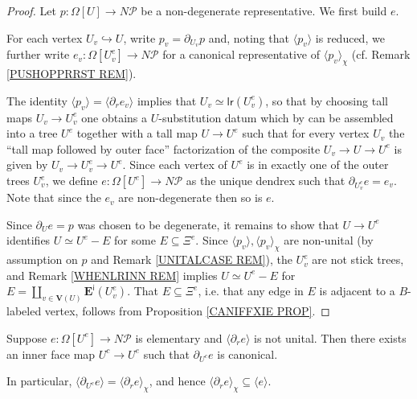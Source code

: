 \documentclass[a4paper,10pt
,draft
]{article}%
\renewcommand{\1}{\eta}%
\begin{document}
\begin{proof}
Let $p\colon \Omega[U] \to N \mathcal{P}$
be a non-degenerate representative. We first build $e$.


For each vertex $U_v \hookrightarrow U$, write
$p_v = \partial_{U_v} p$
and,
noting that $\langle p_v \rangle$ is reduced,
we further write 
$e_v \colon \Omega[U^e_v] \to N \mathcal{P}$
for a canonical representative of 
$\langle p_v \rangle_{\chi}$
(cf. Remark \ref{PUSHOPPRRST REM}).


The identity
$\langle p_v \rangle = \langle \partial_r e_v \rangle$
implies that
$U_v \simeq \mathsf{lr}(U^e_v)$,
so that by choosing tall maps $U_v \to U^e_v$ 
one obtains a $U$-substitution datum
\cite[Def. 3.38]{BP_geo}
which by 
\cite[Prop. 3.41]{BP_geo}
can be assembled into a tree $U^e$
together with a tall map
$U \to U^e$ such that for every vertex $U_v$
the ``tall map followed by outer face'' factorization of
the composite
$U_v \to U \to U^e$
is given by
$U_v \to U^e_v \to U^e$.
Since each vertex of $U^e$ is in exactly one of the outer trees $U^e_v$,
we define $e \colon \Omega[U^e] \to N \mathcal{P}$
as the unique dendrex such that
$\partial_{U^e_v} e = e_v$.
Note that since the $e_v$ are non-degenerate then so is $e$.


Since $\partial_{U}e = p$ was chosen to be degenerate,
it remains to show that
$U \to U^e$ identifies $U \simeq U^e - E$
for some $E \subseteq \Xi^{e}$.
Since $\langle p_v \rangle, \langle p_v \rangle_{\chi}$ are non-unital
(by assumption on $p$ and Remark \ref{UNITALCASE REM}),
the $U^e_v$ are not stick trees,
and Remark \ref{WHENLRINN REM} implies
$U \simeq U^e-E$ for 
$E = \amalg_{v \in \boldsymbol{V}(U)} \boldsymbol{E}^{\mathsf{i}}(U^e_v)$.
%
That
$E \subseteq \Xi^{e}$, i.e. that any edge in $E$ is adjacent to a $B$-labeled vertex,
follows from Proposition \ref{CANIFFXIE PROP}.
\end{proof}


\begin{lemma}\label{FORSAKEN LEM}
Suppose $e \colon \Omega[U^e] \to N \mathcal{P}$ is elementary
and $\langle \partial_r e\rangle$ is not unital.
Then there exists an inner face map
$U^c \to U^e$ such that $\partial_{U^c} e$ is canonical.

In particular,
$\langle \partial_{U^c} e \rangle = \langle \partial_r e \rangle_{\chi}$,
and hence 
$\langle \partial_r e \rangle_{\chi} \subseteq \langle e \rangle$.
\end{lemma}
\end{document}
